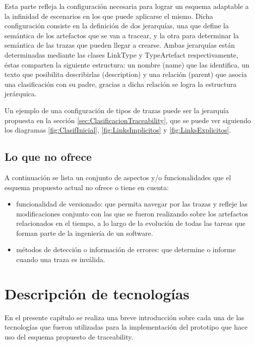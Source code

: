 \documentclass[a4paper,12pt,oneside,spanish]{book}
\begin{document}
Esta parte refleja la configuración necesaria para lograr un esquema adaptable a la infinidad de escenarios en los que puede aplicarse el mismo. Dicha configuración consiste en la definición de dos jerarquías, una que define la semántica de los artefactos que se van a tracear, y la otra para determinar la semántica de las trazas que pueden llegar a crearse. Ambas jerarquías están determinadas mediante las clases LinkType y TypeArtefact respectivamente, éstas comparten la siguiente estructura: un nombre (name) que las identifica, un texto que posibilita describirlas (description) y una relación (parent) que asocia una clasificación con su padre, gracias a dicha relación se logra la estructura jerárquica.

Un ejemplo de una configuración de tipos de trazas puede ser la jerarquía propuesta en la sección \ref{sec:ClasificacionTraceability}, que se puede ver siguiendo los diagramas \ref{fig:ClasifInicial}, \ref{fig:LinksImplicitos} y \ref{fig:LinksExplicitos}.


\section{Lo que no ofrece}

A continuación se lista un conjunto de aspectos y/o funcionalidades que el esquema propuesto actual no ofrece o tiene en cuenta:

\begin{itemize}

\item funcionalidad de versionado: que permita navegar por las trazas y refleje las modificaciones conjunto con las que se fueron realizando sobre los artefactos relacionados en el tiempo, a lo largo de la evolución de todas las tareas que forman parte de la ingeniería de un software.

\item métodos de detección o información de errores: que determine o informe cuando una traza es inválida.

\end{itemize}

\chapter{Descripción de tecnologías}

En el presente capítulo se realiza una breve introducción sobre cada una de las tecnologías que fueron utilizadas para la implementación del prototipo que hace uso del esquema propuesto de traceability.
\end{document}
